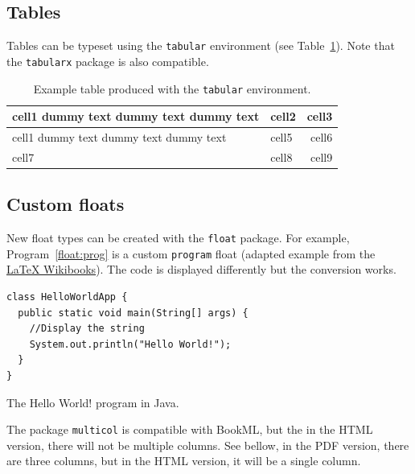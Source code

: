 \subsection{Tables}
\label{float:tab}

Tables can be typeset using the \verb|tabular| environment (see Table~\ref{tab:tabular}). Note that the \verb|tabularx| package is also compatible.

\begin{table}
    \centering
    \begin{tabular}{| l | l | r |} 
      \hline
      cell1 dummy text dummy text dummy text & cell2 & cell3 \\ 
      \hline
      cell1 dummy text dummy text dummy text & cell5 & cell6 \\ 
      \hline
      cell7 & cell8 & cell9 \\ 
      \hline
    \end{tabular}

    \caption{Example table produced with the \texttt{tabular} environment.}
    \label{tab:tabular}
\end{table}


\subsection{Custom floats}
\label{float:custom}

New float types can be created with the \verb|float| package. For example, Program~\ref{float:prog} is a custom \verb|program| float (adapted example from the \href{https://en.wikibooks.org/wiki/LaTeX/Floats,_Figures_and_Captions}{LaTeX Wikibooks}). The code is displayed differently but the conversion works.

\begin{program}
  \begin{verbatim}
class HelloWorldApp {
  public static void main(String[] args) {
    //Display the string
    System.out.println("Hello World!");
  }
}
\end{verbatim}
  \caption{The Hello World! program in Java.}
  \label{float:prog}
\end{program}


The package \verb|multicol| is compatible with BookML, but the in the HTML version, there will not be multiple columns. See bellow, in the PDF version, there are three columns, but in the HTML version, it will be a single column.
\begin{multicols}{3}
     \lipsum[1-2]
\end{multicols}

